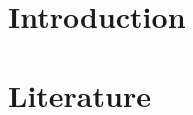 \documentclass[twoside]{ctuthesis}
\theoremstyle{plain}
\theoremstyle{definition}
\theoremstyle{note}
\begin{document}
\maketitle

\chapter{Introduction}


\chapter{Literature}







%

%

%

%

\appendix

\printindex






\end{document}
